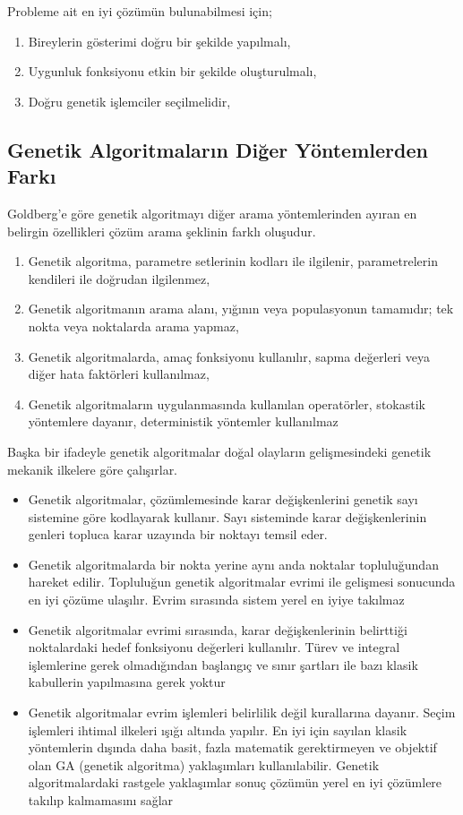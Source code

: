 \documentclass[12pt, a4paper]{article}
\begin{document}
\begin{flushleft}
	Probleme ait en iyi çözümün bulunabilmesi için; 
	\begin{enumerate}
		\item {Bireylerin gösterimi doğru bir şekilde yapılmalı,}
		\item {Uygunluk fonksiyonu etkin bir şekilde oluşturulmalı,}
		\item { Doğru genetik işlemciler seçilmelidir,}
	\end{enumerate}
	
	
		\subsection{Genetik Algoritmaların Diğer Yöntemlerden Farkı}
	Goldberg’e göre genetik algoritmayı diğer arama yöntemlerinden ayıran en 
	belirgin özellikleri çözüm arama şeklinin farklı oluşudur.
	\begin{enumerate}
		\item {Genetik algoritma, parametre setlerinin kodları ile ilgilenir, parametrelerin 
			kendileri ile doğrudan ilgilenmez,}
		\item {Genetik algoritmanın arama alanı, yığının veya populasyonun tamamıdır; 
			tek nokta veya noktalarda arama yapmaz, }
		\item {Genetik algoritmalarda, amaç fonksiyonu kullanılır, sapma değerleri veya 
			diğer hata faktörleri kullanılmaz, }
		\item {Genetik algoritmaların uygulanmasında kullanılan operatörler, stokastik 
			yöntemlere dayanır, deterministik yöntemler kullanılmaz}
	\end{enumerate}
	Başka bir ifadeyle genetik algoritmalar doğal olayların gelişmesindeki 
	genetik mekanik ilkelere göre çalışırlar.
	\begin{itemize}
		\item {Genetik algoritmalar, çözümlemesinde karar değişkenlerini genetik sayı 
			sistemine göre kodlayarak kullanır. Sayı sisteminde karar değişkenlerinin genleri 
			topluca karar uzayında bir noktayı temsil eder.}
		\item {Genetik algoritmalarda bir nokta yerine aynı anda noktalar topluluğundan 
			hareket edilir. Topluluğun genetik algoritmalar evrimi ile gelişmesi sonucunda en iyi 
			çözüme ulaşılır. Evrim sırasında sistem yerel en iyiye takılmaz}
		\item {Genetik algoritmalar evrimi sırasında, karar değişkenlerinin belirttiği 
			noktalardaki hedef fonksiyonu değerleri kullanılır. Türev ve integral işlemlerine 
			gerek olmadığından başlangıç ve sınır şartları ile bazı klasik kabullerin yapılmasına 
			gerek yoktur}		
		\item{Genetik algoritmalar evrim işlemleri belirlilik değil kurallarına dayanır. 
			Seçim işlemleri ihtimal ilkeleri ışığı altında yapılır. En iyi için sayılan klasik 
			yöntemlerin dışında daha basit, fazla matematik gerektirmeyen ve objektif olan GA
			(genetik algoritma) yaklaşımları kullanılabilir. Genetik algoritmalardaki rastgele 
			yaklaşımlar sonuç çözümün yerel en iyi çözümlere takılıp kalmamasını sağlar}	
	\end{itemize}
	

\end{flushleft}
\end{document}
